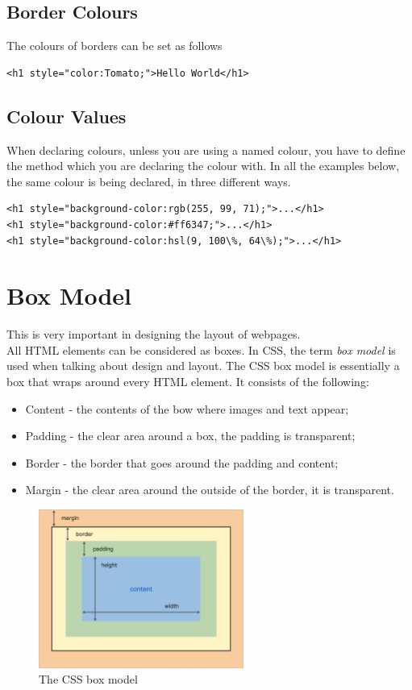\documentclass{thomasClass}
\begin{document}
\subsection{Border Colours}
The colours of borders can be set as follows
\begin{Verbatim}[breaklines=true, breakanywhere=true]
<h1 style="color:Tomato;">Hello World</h1>
\end{Verbatim}
\subsection{Colour Values}
When declaring colours, unless you are using a named colour, you have to define the method which you are declaring the colour with. In all the examples below, the same colour is being declared, in three different ways.
\begin{Verbatim}[breaklines=true, breakanywhere=true]
<h1 style="background-color:rgb(255, 99, 71);">...</h1>
<h1 style="background-color:#ff6347;">...</h1>
<h1 style="background-color:hsl(9, 100\%, 64\%);">...</h1>
\end{Verbatim}

\section{Box Model}
This is very important in designing the layout of webpages.\\
All HTML elements can be considered as boxes. In CSS, the term \textit{box model} is used when talking about design and layout. The CSS box model is essentially a box that wraps around every HTML element. It consists of the following:
\begin{itemize}
    \item Content - the contents of the bow where images and text appear;
    \item Padding - the clear area around a box, the padding is transparent;
    \item Border - the border that goes around the padding and content;
    \item Margin - the clear area around the outside of the border, it is transparent.
\end{itemize}
\begin{figure}[H]
    \centering
    \includegraphics[width=0.6\textwidth]{images/css-box-model.png}
    \caption{The CSS box model}
    \label{fig:cssBoxModel}
\end{figure}
\end{document}
